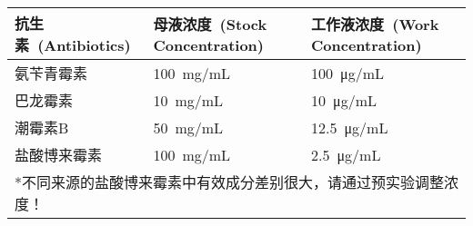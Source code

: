 \begin{table}[htbp]
\small
\centering
{
\par}
\begin{tabular*}{\textwidth}[c]{@{\extracolsep{\fill}}lll}
\toprule
抗生素\ (Antibiotics) & 母液浓度\ (Stock Concentration) & 工作液浓度\ (Work Concentration) \\
\midrule
氨苄青霉素   & \SI{100}{\mg/\mL} & \SI{100}{\ug/\mL}  \\
巴龙霉素     & \SI{10}{\mg/\mL}  & \SI{10}{\ug/\mL}   \\
潮霉素B      & \SI{50}{\mg/\mL}  & \SI{12.5}{\ug/\mL} \\
盐酸博来霉素 & \SI{100}{\mg/\mL} & \SI{2.5}{\ug/\mL}  \\
\bottomrule
\multicolumn{3}{l}{*不同来源的盐酸博来霉素中有效成分差别很大，请通过预实验调整浓度！}
\end{tabular*}
\end{table}

